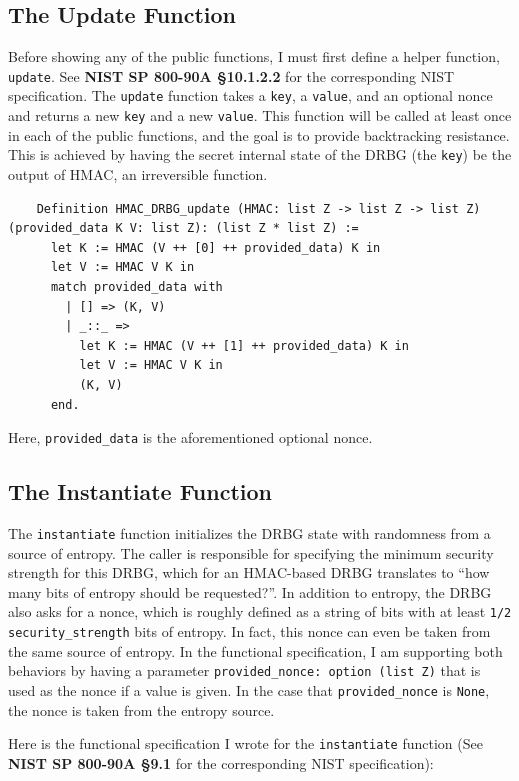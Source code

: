 \documentclass[pageno]{jpaper}
\newcommand{\stdtitle}[1]{\textbf{#1}}
\begin{document}
\subsection{The Update Function}
Before showing any of the public functions, I must first define a helper function, \lstinline{update}. See \stdtitle{NIST SP 800-90A \S 10.1.2.2} for the corresponding NIST specification. The \lstinline{update} function takes a \lstinline{key}, a \lstinline{value}, and an optional nonce and returns a new \lstinline{key} and a new \lstinline{value}. This function will be called at least once in each of the public functions, and the goal is to provide backtracking resistance. This is achieved by having the secret internal state of the DRBG (the \lstinline{key}) be the output of HMAC, an irreversible function.

\begin{lstlisting}
    Definition HMAC_DRBG_update (HMAC: list Z -> list Z -> list Z) (provided_data K V: list Z): (list Z * list Z) :=
      let K := HMAC (V ++ [0] ++ provided_data) K in
      let V := HMAC V K in
      match provided_data with
        | [] => (K, V)
        | _::_ =>
          let K := HMAC (V ++ [1] ++ provided_data) K in
          let V := HMAC V K in
          (K, V)
      end.
\end{lstlisting}

Here, \lstinline{provided_data} is the aforementioned optional nonce.

\subsection{The Instantiate Function}

The \lstinline{instantiate} function initializes the DRBG state with randomness from a source of entropy. The caller is responsible for specifying the minimum security strength for this DRBG, which for an HMAC-based DRBG translates to “how many bits of entropy should be requested?”. In addition to entropy, the DRBG also asks for a nonce, which is roughly defined as a string of bits with at least \lstinline{1/2 security_strength} bits of entropy. In fact, this nonce can even be taken from the same source of entropy. In the functional specification, I am supporting both behaviors by having a parameter \lstinline{provided_nonce: option (list Z)} that is used as the nonce if a value is given. In the case that \lstinline{provided_nonce} is \lstinline{None}, the nonce is taken from the entropy source.

Here is the functional specification I wrote for the \lstinline{instantiate} function (See \stdtitle{NIST SP 800-90A \S 9.1} for the corresponding NIST specification):
\end{document}
